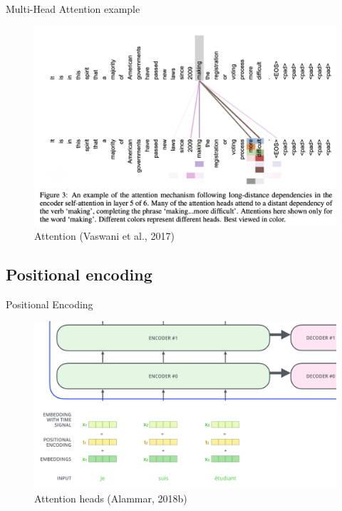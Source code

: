 \documentclass[10pt]{beamer}
\begin{document}
\begin{frame}{Multi-Head Attention example}

\begin{figure}[h]
\centering
\includegraphics[width=1\textwidth]{fig/Vaswani_3_attention.png}
\caption{Attention (Vaswani et al., 2017)}
\end{figure}

\end{frame}

\subsection{Positional encoding}

\begin{frame}{Positional Encoding}

\begin{figure}[h]
\centering
\includegraphics[width=1\textwidth]{fig/alammar_transformer_positional_encoding_vectors.png}
\caption{Attention heads (Alammar, 2018b)}
\end{figure}

\end{frame}
\end{document}
